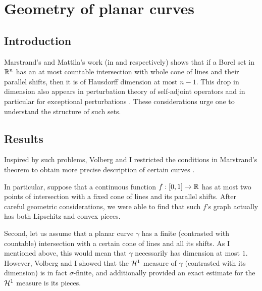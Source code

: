 \documentclass[11pt]{amsart} %
\theoremstyle{remark} %
\theoremstyle{definition} %
\numberwithin{equation}{section} %
\newcommand{\0}[1]{\overline{#1}} %
\newcommand{\1}[1]{\tilde{#1}} %
\newcommand{\2}[1]{{}_{|#1}} %
\begin{document}
\section{Geometry of planar curves}	\label{sec:Marstrand}

\subsection*{Introduction}	%
Marstrand's and Mattila's work (in \cite{Mar1954} and \cite{Mat1975} respectively) shows that if a Borel set in ${\mathbb{R}}^n$ has an at most countable intersection with whole cone of lines and their parallel shifts, then it is of Hausdorff dimension at most $n-1$. This drop in dimension also appears in perturbation theory of self-adjoint operators and in particular for exceptional perturbations \cite{LiaTreVol2020}. These considerations urge one to understand the structure of such sets.

\subsection*{Results}	%
Inspired by such problems, Volberg and I restricted the conditions in Marstrand's theorem to obtain more precise description of certain curves \cite{VarVol2019ep_2021}.

In particular, suppose that a continuous function $f:[0,1]\to{\mathbb{R}}$ has at most two points of intersection with a fixed cone of lines and its parallel shifts. After careful geometric considerations, we were able to find that such $f$'s graph actually has both Lipschitz and convex pieces.

Second, let us assume that a planar curve $γ$ has a finite (contrasted with countable) intersection with a certain cone of lines and all its shifts. As I mentioned above, this would mean that $γ$ necessarily has dimension at most $1$. However, Volberg and I showed that the ${\mathcal{H}}^1$ measure of $γ$ (contrasted with its dimension) is in fact $σ$-finite, and additionally provided an exact estimate for the ${\mathcal{H}}^1$ measure is its pieces.
\end{document}
